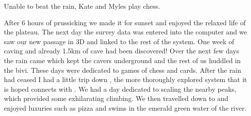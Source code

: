     \begin{marginfigure}
\checkoddpage \ifoddpage \forcerectofloat \else \forceversofloat \fi
\centering
 \caption{Unable to beat the rain, Kate and Myles play chess. }
 \label{chess game}
\end{marginfigure}

After 6 hours of prussicking we made it for sunset and enjoyed the relaxed life of the plateau. The
next day the survey data was entered into the computer and we saw our new passage in 3D and linked
to the rest of the system. One week of caving and already 1.5km of cave had been discovered! Over the
next few days the rain came which kept the cavers underground and the rest of us huddled in the bivi. These days were dedicated to games of chess and cards. After the rain had ceased I had a little trip
down , the more thoroughly explored system that it is hoped connects with .
We had a day dedicated to scaling the nearby peaks, which provided some exhilarating climbing. We
then travelled down to  and enjoyed luxuries such as pizza and swims in the emerald green
water of the  river.


